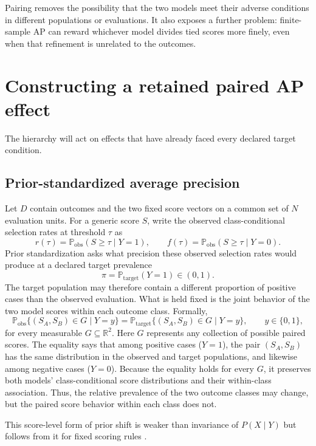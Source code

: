 \documentclass[11pt]{article}
\newcommand{\Prb}{\mathbb{P}}
\theoremstyle{remark}
\begin{document}
Pairing removes the possibility that the two models meet their adverse
conditions in different populations or evaluations. It also exposes a further
problem: finite-sample AP can reward whichever model divides tied scores more
finely, even when that refinement is unrelated to the outcomes.


\section{Constructing a retained paired AP effect}
\label{sec:paired-effect}

The hierarchy will act on effects that have already faced every declared target
condition.

\subsection{Prior-standardized average precision}

Let $D$ contain outcomes and the two fixed score vectors on a common set of
$N$ evaluation units. For a generic score $S$, write the observed
class-conditional selection rates at threshold $\tau$ as
\[
r(\tau)=\Prb_{\mathrm{obs}}(S\geq\tau\mid Y=1),
\qquad
f(\tau)=\Prb_{\mathrm{obs}}(S\geq\tau\mid Y=0).
\]
Prior standardization asks what precision these observed selection rates would
produce at a declared target prevalence
\[
\pi=\Prb_{\mathrm{target}}(Y=1)\in(0,1).
\]
The target population may therefore contain a different proportion of positive
cases than the observed evaluation. What is held fixed is the joint behavior
of the two model scores within each outcome class. Formally,
\begin{equation}
\Prb_{\mathrm{obs}}\{(S_A,S_B)\in G\mid Y=y\}
=
\Prb_{\mathrm{target}}\{(S_A,S_B)\in G\mid Y=y\},
\qquad y\in\{0,1\},
\label{eq:score-invariance}
\end{equation}
for every measurable $G\subseteq\mathbb R^2$. Here $G$ represents any
collection of possible paired scores. The equality says that among positive
cases ($Y=1$), the pair $(S_A,S_B)$ has the same distribution in the observed
and target populations, and likewise among negative cases ($Y=0$). Because the
equality holds for every $G$, it preserves both models' class-conditional score
distributions and their within-class association. Thus, the relative
prevalence of the two outcome classes may change, but the paired score behavior
within each class does not.

This score-level form of prior shift is weaker than invariance of $P(X\mid Y)$
but follows from it for fixed scoring rules
\cite{saerens2002adjusting,storkey2009training,lipton2018detecting}.
\end{document}

